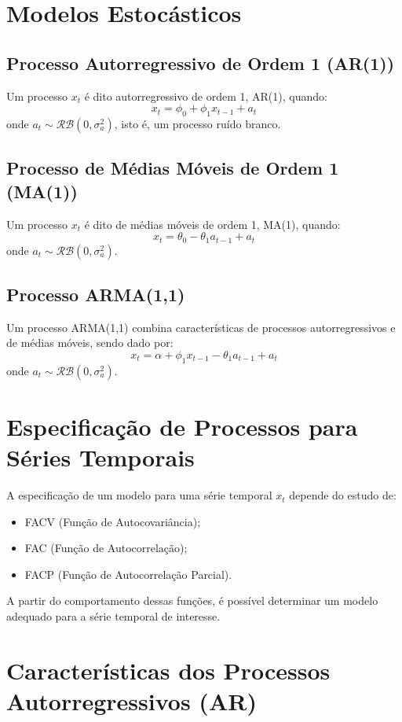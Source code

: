 \documentclass{sciposter}
\begin{document}
\begin{multicols}{3}
\section{\textbf{Modelos Estocásticos}}

\subsection{Processo Autorregressivo de Ordem 1 (AR(1))}
Um processo $x_t$ é dito autorregressivo de ordem 1, AR(1), quando:
\[
x_t = \phi_0 + \phi_1 x_{t-1} + a_t
\]
onde $a_t \sim \mathcal{RB}(0, \sigma_a^2)$, isto é, um processo ruído branco.

\subsection{Processo de Médias Móveis de Ordem 1 (MA(1))}
Um processo $x_t$ é dito de médias móveis de ordem 1, MA(1), quando:
\[
x_t = \theta_0 - \theta_1 a_{t-1} + a_t
\]
onde $a_t \sim \mathcal{RB}(0, \sigma_a^2)$.

\subsection{Processo ARMA(1,1)}
Um processo ARMA(1,1) combina características de processos autorregressivos e de médias móveis, sendo dado por:
\[
x_t = \alpha + \phi_1 x_{t-1} - \theta_1 a_{t-1} + a_t
\]
onde $a_t \sim \mathcal{RB}(0, \sigma_a^2)$.

\section{\textbf{Especificação de Processos para Séries Temporais}}
A especificação de um modelo para uma série temporal $x_t$ depende do estudo de:
\begin{itemize}
    \item FACV (Função de Autocovariância);
    \item FAC (Função de Autocorrelação);
    \item FACP (Função de Autocorrelação Parcial).
\end{itemize}

A partir do comportamento dessas funções, é possível determinar um modelo adequado para a série temporal de interesse.

\section{\textbf{Características dos Processos Autorregressivos (AR)}}


\end{multicols}
\end{document}

